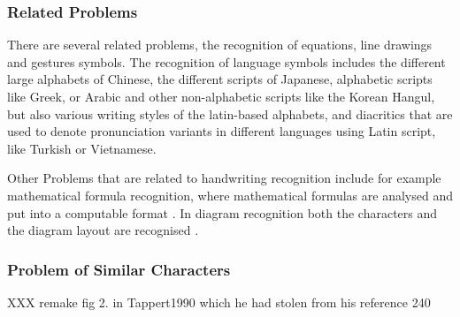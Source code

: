 \subsubsection{Related Problems}
\label{sec:relatedproblems}

There are several related problems, the recognition of equations, line 
drawings and gestures symbols. The recognition of language symbols includes 
the different large alphabets of Chinese, the different scripts of Japanese, 
alphabetic scripts like Greek, or Arabic and other non-alphabetic scripts like
the Korean  Hangul, but also various writing styles of the latin-based 
alphabets, and diacritics that are used to denote pronunciation variants in 
different languages using Latin script, like Turkish or Vietnamese.

Other Problems that are related to handwriting recognition include for example
mathematical formula recognition, where mathematical formulas are analysed and 
put into a computable format . In diagram recognition 
both the characters and the diagram layout are recognised 
.

\subsubsection{Problem of Similar Characters}
\label{sec:similarcharacters}

XXX remake fig 2. in Tappert1990 which he had stolen from his reference 240

